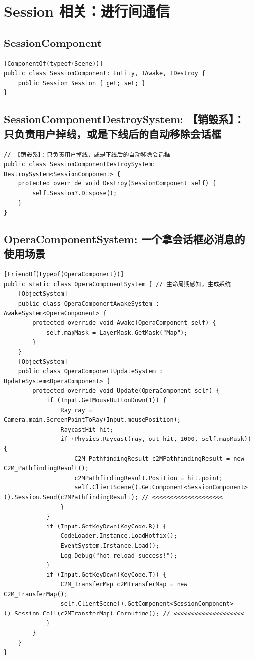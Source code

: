 \documentclass[9pt, b5paper]{article}
\begin{document}
\section{Session 相关：进行间通信}
\label{sec-8}
\subsection{SessionComponent}
\label{sec-8-1}
\begin{verbatim}
[ComponentOf(typeof(Scene))]
public class SessionComponent: Entity, IAwake, IDestroy {
    public Session Session { get; set; }
}
\end{verbatim}
\subsection{SessionComponentDestroySystem: 【销毁系】：只负责用户掉线，或是下线后的自动移除会话框}
\label{sec-8-2}
\begin{verbatim}
// 【销毁系】：只负责用户掉线，或是下线后的自动移除会话框 
public class SessionComponentDestroySystem: DestroySystem<SessionComponent> {
    protected override void Destroy(SessionComponent self) {
        self.Session?.Dispose();
    }
}
\end{verbatim}
\subsection{OperaComponentSystem: 一个拿会话框必消息的使用场景}
\label{sec-8-3}
\begin{verbatim}
[FriendOf(typeof(OperaComponent))]
public static class OperaComponentSystem { // 生命周期感知，生成系统
    [ObjectSystem]
    public class OperaComponentAwakeSystem : AwakeSystem<OperaComponent> {
        protected override void Awake(OperaComponent self) {
            self.mapMask = LayerMask.GetMask("Map");
        }
    }
    [ObjectSystem]
    public class OperaComponentUpdateSystem : UpdateSystem<OperaComponent> {
        protected override void Update(OperaComponent self) {
            if (Input.GetMouseButtonDown(1)) {
                Ray ray = Camera.main.ScreenPointToRay(Input.mousePosition);
                RaycastHit hit;
                if (Physics.Raycast(ray, out hit, 1000, self.mapMask)) {
                    C2M_PathfindingResult c2MPathfindingResult = new C2M_PathfindingResult();
                    c2MPathfindingResult.Position = hit.point;
                    self.ClientScene().GetComponent<SessionComponent>().Session.Send(c2MPathfindingResult); // <<<<<<<<<<<<<<<<<<<< 
                }
            }
            if (Input.GetKeyDown(KeyCode.R)) {
                CodeLoader.Instance.LoadHotfix();
                EventSystem.Instance.Load();
                Log.Debug("hot reload success!");
            }
            if (Input.GetKeyDown(KeyCode.T)) {
                C2M_TransferMap c2MTransferMap = new C2M_TransferMap();
                self.ClientScene().GetComponent<SessionComponent>().Session.Call(c2MTransferMap).Coroutine(); // <<<<<<<<<<<<<<<<<<<< 
            }
        }
    }
}
\end{verbatim}
\end{document}
